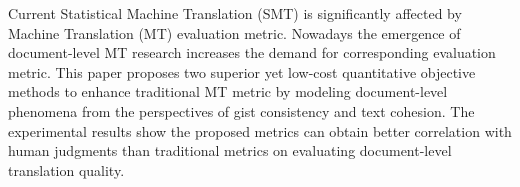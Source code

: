 Current Statistical Machine Translation (SMT) is significantly affected by Machine Translation (MT) evaluation metric. Nowadays the emergence of document-level MT research increases the demand for corresponding evaluation metric. This paper proposes two superior yet low-cost quantitative objective methods to enhance traditional MT metric by modeling document-level phenomena from the perspectives of gist consistency and text cohesion. The experimental results show the proposed metrics can obtain better correlation with human judgments than traditional metrics on evaluating document-level translation quality.
